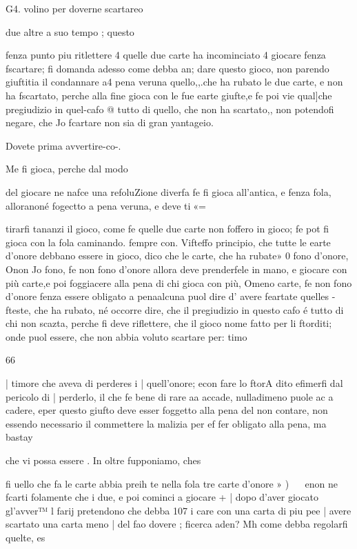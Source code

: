 \documentclass[12pt,a6paper]{article}
\begin{document}
 

 

 

G4.
volino per doverne scartareo

due altre a suo tempo ; questo

fenza punto piu ritlettere 4 quelle due carte ha incominciato 4
giocare fenza fscartare; fi domanda adesso come debba an;
dare questo gioco, non parendo
giuftitia il condannare a4 pena
veruna quello,,.che ha rubato le
due carte, e non ha fscartato,
perche alla fine gioca con le fue
earte giufte,e fe poi vie qual]che pregiudizio in quel-cafo @
tutto di quello, che non ha scartato,, non potendofi negare, che
Jo fcartare non sia di gran yantageio.

Dovete prima avvertire-co-.

Me fi gioca, perche dal modo

del giocare ne nafce una refoluZione diverfa fe fi gioca all’antica, e fenza fola, alloranoné
fogectto a pena veruna, e deve
ti«=

tirarfi tananzi il gioco, come fe
quelle due carte non foffero in
gioco; fe pot fi gioca con la
fola caminando. fempre con.
Vifteffo principio, che tutte le
earte d’onore debbano essere in
gioco, dico che le carte, che ha
rubate» 0 fono d’onore, Onon
Jo fono, fe non fono d’onore
allora deve prenderfele in mano, e giocare con più carte,e
poi foggiacere alla pena di chi
gioca con più, Omeno carte,
fe non fono d’onore fenza essere obligato a penaalcuna puol
dire d' avere feartate quelles
- fteste, che ha rubato, né occorre dire, che il pregiudizio in
questo cafo é tutto di chi non
scazta, perche fi deve riflettere,
che il gioco nome fatto per li
ftorditi; onde puol essere, che
non abbia voluto scartare per:
timo  

66

| timore che aveva di perderes
i | quell’onore; econ fare lo ftorA dito efimerfi dal pericolo di
| perderlo, il che fe bene di rare
aa accade, nulladimeno puole ac
a cadere, eper questo giufto deve
esser foggetto alla pena del non
contare, non essendo necessario
il commettere la malizia per ef
fer obligato alla pena, ma bastay

che vi possa essere .
In oltre fupponiamo, ches

fi uello che fa le carte abbia preih te nella fola tre carte d’onore »
) ~~ enon ne fcarti folamente che
i due, e poi cominci a giocare +
| dopo d’aver giocato gl’avver™
l farij pretendono che debba 107
i care con una carta di piu pee
| avere scartato una carta meno
| del fao dovere ; ficerca aden?
Mh come debba regolarfi quelte, es
\end{document}
